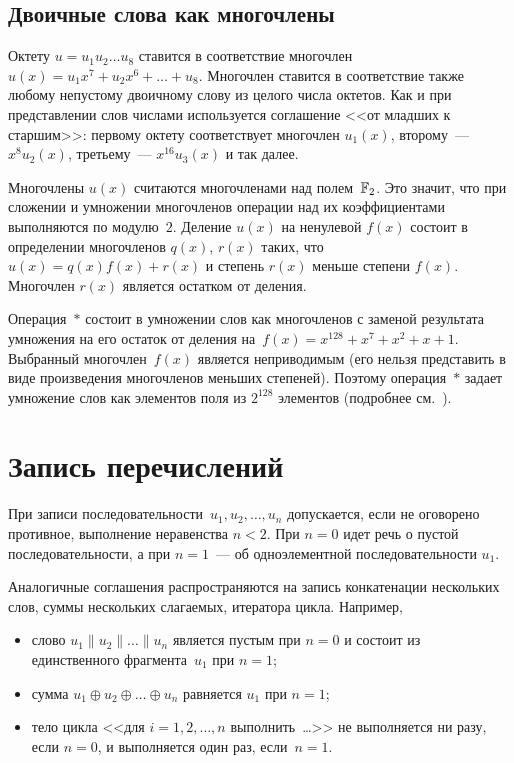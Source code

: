 \subsection{Двоичные слова как многочлены}\label{DEFS.Poly}

Октету $u=u_1 u_2\ldots u_8$ ставится в соответствие многочлен
$u(x)=u_1 x^7+u_2 x^6 +\ldots + u_8$. 
%
Многочлен ставится в соответствие также любому непустому
двоичному слову из целого числа октетов.
Как и при представлении слов числами используется 
соглашение <<от младших к старшим>>:
первому октету соответствует многочлен $u_1(x)$,
второму~--- $x^8 u_2(x)$, третьему~--- $x^{16}u_3(x)$ и так далее.

Многочлены $u(x)$ считаются многочленами над полем~$\mathbb{F}_2$. 
Это значит, что при сложении и умножении многочленов операции над их
коэффициентами выполняются по модулю~$2$.
%
Деление $u(x)$ на ненулевой $f(x)$ состоит в определении многочленов 
$q(x)$, $r(x)$ таких, что $u(x)=q(x)f(x)+r(x)$ и степень $r(x)$ меньше 
степени $f(x)$. 
Многочлен $r(x)$ является остатком от деления.

Операция~$\ast$ состоит в умножении слов как многочленов с заменой результата
умножения на его остаток от деления на~$f(x)=x^{128}+x^7+x^2+x+1$. 
%
Выбранный многочлен~$f(x)$ является неприводимым (его нельзя представить
в виде произведения многочленов меньших степеней).
Поэтому операция~$\ast$ задает умножение слов как элементов поля из $2^{128}$
элементов (подробнее см.~\cite{LidNid88}).

\section{Запись перечислений}\label{DEFS.Seqs}

При записи последовательности~$u_1,u_2,\ldots,u_n$ 
допускается, если не оговорено противное, выполнение неравенства $n<2$.
При $n=0$ идет речь о пустой последовательности, 
а при $n=1$~--- об одноэлементной последовательности $u_1$.

Аналогичные соглашения распространяются на запись конкатенации нескольких
слов, суммы нескольких слагаемых, итератора цикла.
%
Например,
\begin{itemize}
\item
слово $u_1\parallel u_2\parallel\ldots\parallel u_n$ является пустым при $n=0$ 
и состоит из единственного фрагмента~$u_1$ при $n=1$;
\item
сумма $u_1\oplus u_2\oplus\ldots\oplus u_n$ равняется $u_1$ при $n=1$;
%
\item
тело цикла <<для $i=1,2,\ldots,n$ выполнить~\ldots>>
не выполняется ни разу, если $n=0$, и выполняется один раз, если~$n=1$.
\end{itemize}


